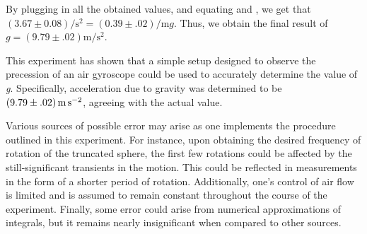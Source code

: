 \begin{paper}

By plugging in all the obtained values, and equating \eqR and \eqS, we get that
$(3.67\pm0.08)\si{\per\second\squared}=(0.39\pm.02)\si{\per\metre}g$.
Thus, we obtain the final result of $g=(9.79\pm.02)\si{\metre\per\second\squared}$.


	This experiment has shown that a simple setup designed to observe the precession of an air gyroscope could be used to accurately determine the value of \textit{g}. Specifically, acceleration due to gravity was determined to be \( \left(9.79 \pm .02\right) \si{\metre\per\second\squared} \), agreeing with the actual value.
	
	Various sources of possible error may arise as one implements the procedure outlined in this experiment. For instance, upon obtaining the desired frequency of rotation of the truncated sphere, the first few rotations could be affected by the still-significant transients in the motion. This could be reflected in measurements in the form of a shorter period of rotation. Additionally, one's control of air flow is limited and is assumed to remain constant throughout the course of the experiment. Finally, some error could arise from numerical approximations of integrals, but it remains nearly insignificant when compared to other sources. 
	


\end{paper}
